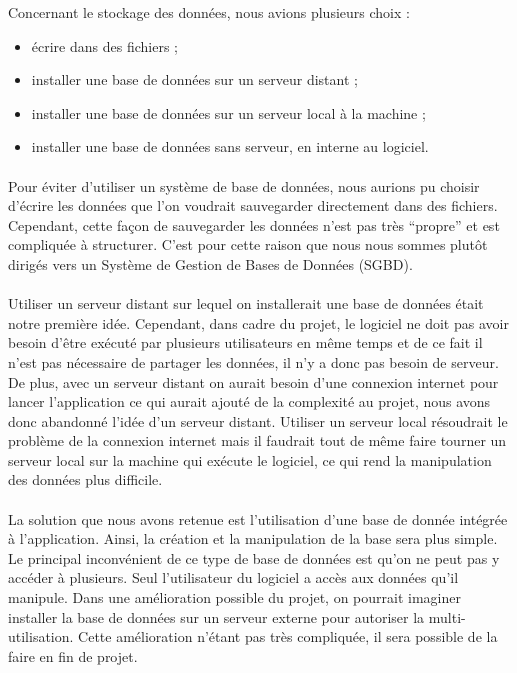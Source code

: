 Concernant le stockage des données, nous avions plusieurs choix :
\begin{itemize}
\item écrire dans des fichiers ;
\item installer une base de données sur un serveur distant ;
\item installer une base de données sur un serveur local à la machine ;
\item installer une base de données sans serveur, en interne au logiciel.
\end{itemize}

\paragraph{}
Pour éviter d’utiliser un système de base de données, nous aurions pu choisir
d’écrire les données que l’on voudrait sauvegarder directement dans des
fichiers. Cependant, cette façon de sauvegarder les données n’est pas très
“propre” et est compliquée à structurer. C’est pour cette raison que nous nous
sommes plutôt dirigés vers un Système de Gestion de Bases de Données (SGBD).

\paragraph{}
Utiliser un serveur distant sur lequel on installerait une base de données était 
notre première idée. Cependant, dans cadre du projet, le logiciel ne doit pas avoir 
besoin d’être exécuté par plusieurs utilisateurs en même temps et de ce fait il n’est 
pas nécessaire de partager les données, il n’y a donc pas besoin de serveur. De plus, 
avec un serveur distant on aurait besoin d’une connexion internet pour lancer 
l’application ce qui aurait ajouté de la complexité au projet, nous avons donc 
abandonné l’idée d’un serveur distant. Utiliser un serveur local résoudrait le problème 
de la connexion internet mais il faudrait tout de même faire tourner un serveur local 
sur la machine qui exécute le logiciel, ce qui rend la manipulation des données plus difficile.


\paragraph{}
La solution que nous avons retenue est l’utilisation d’une base de donnée
intégrée à l’application. Ainsi, la création et la manipulation de la base
sera plus simple. Le principal inconvénient de ce type de base de données est
qu’on ne peut pas y accéder à plusieurs. Seul l’utilisateur du logiciel a accès
aux données qu’il manipule. Dans une amélioration possible du projet, on
pourrait imaginer installer la base de données sur un serveur externe pour
autoriser la multi-utilisation. Cette amélioration n’étant pas très compliquée,
il sera possible de la faire en fin de projet.

